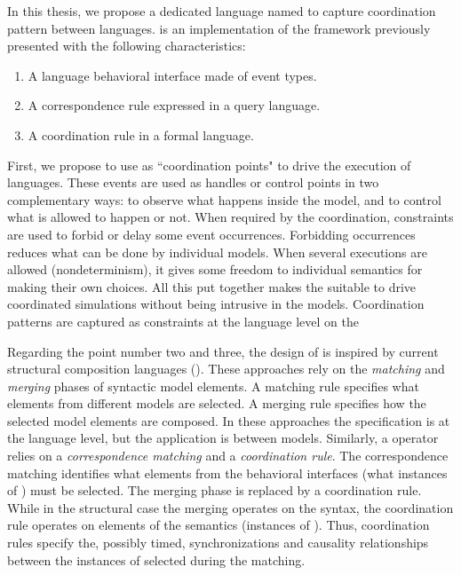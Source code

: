 In this thesis, we propose a dedicated language named \bcool to capture coordination pattern between languages. \bcool is an implementation of the framework previously presented with the following characteristics: 

\begin{enumerate}
	\item A language behavioral interface made of event types. 
	\item A correspondence rule expressed in a query language. 
	\item A coordination rule in a formal language. 
\end{enumerate}

First, we propose to use \dse as ``coordination points" to drive the execution of languages. These events are used as handles or control points in two complementary ways: to observe what happens inside the model, and to control what is allowed to happen or not. When required by the coordination, constraints are used to forbid or delay some event occurrences. Forbidding occurrences reduces what can be done by individual models. When several executions are allowed
(nondeterminism), it gives some freedom to individual semantics for making their own choices. All this put together makes the \dse suitable to drive coordinated simulations without being intrusive in the models. Coordination patterns are captured as constraints at the language level on the \dse

Regarding the point number two and three, the design of \bcool is inspired by current structural composition languages (\eg\cite{epsilon,kompose}). These approaches rely on the \emph{matching} and \emph{merging} phases of syntactic model elements. A matching rule specifies what elements from different models are selected. A merging rule specifies how the selected model elements are composed. In these approaches the specification is at the language level, but the application is between models. Similarly, a \bcool operator relies on a \emph{correspondence matching} and a \emph{coordination rule}. The correspondence matching identifies what elements from the behavioral interfaces (\ie what instances of \dse) must be selected. The merging phase is replaced by a coordination rule. While in the structural case the merging operates on the syntax, the coordination rule operates on elements of the semantics (\ie instances of \dse). Thus, coordination rules specify the, possibly timed, synchronizations and causality relationships between the instances of \dse selected during the matching.
